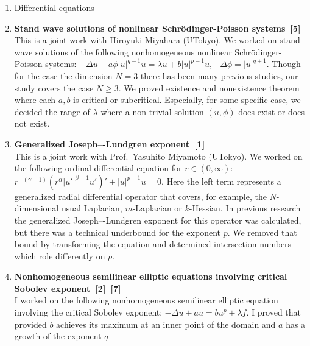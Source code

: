 \documentclass[a4j,twocolumn]{jarticle}
\begin{document}

\begin{enumerate}
 \item[] \underline{Differential equations}
 \item {\bf Stand wave solutions of
       nonlinear Schr\"{o}dinger-Poisson systems~[5]} \\
       This is a joint work with Hiroyuki Miyahara (UTokyo).
       We worked on stand wave solutions
       of the following nonhomogeneous
       nonlinear Schr\"{o}dinger-Poisson systems:
       $-\Delta u -a \phi \left\lvert u \right\rvert^{q-1} u = \lambda u
       + b \left\lvert u \right\rvert^{p-1} u, -\Delta \phi =
       \left\lvert u \right\rvert^{q+1}$.
       Though for the case the dimension $N = 3$
       there has been many previous studies,
       our study covers the case $N \geq 3$.
       We proved existence and nonexistence theorem
       where each $a, b$ is critical or subcritical.
       Especially, for some specific case,
       we decided the range of $\lambda$ where a non-trivial solution
       $(u, \phi)$ does exist or does not exist.
 \item {\bf Generalized Joseph–-Lundgren exponent~[1]} \\
       This is a joint work with Prof.~Yasuhito Miyamoto (UTokyo).
       We worked on the following ordinal differential equation for $r
       \in (0, \infty)$:
       $r^{-(\gamma-1)} (r^\alpha \lvert u' \rvert^{\beta -1 } u')'
       + \lvert u \rvert^{p-1} u = 0$.
       Here the left term represents
       a generalized radial differential operator
       that covers, for example, the $N$-dimensional
       usual Laplacian, $m$-Laplacian or $k$-Hessian.
       In previous research
       the generalized Joseph–-Lundgren exponent for this operator
       was calculated, but there was a technical underbound for
       the exponent $p$.
       We removed that bound by transforming the equation
       and determined intersection numbers
       which role differently on $p$.
 \item {\bf Nonhomogeneous semilinear elliptic equations involving
       critical Sobolev exponent~[2]~[7]} \\
       I worked on the following
       nonhomogeneous semilinear elliptic equation
       involving the critical Sobolev exponent:
       $-\Delta u + a u = b u^p + \lambda f$.
       I proved that provided 
       $b$ achieves its maximum at an inner point of the
       domain and $a$ has a growth of the exponent $q$

\end{enumerate}
\end{document}
